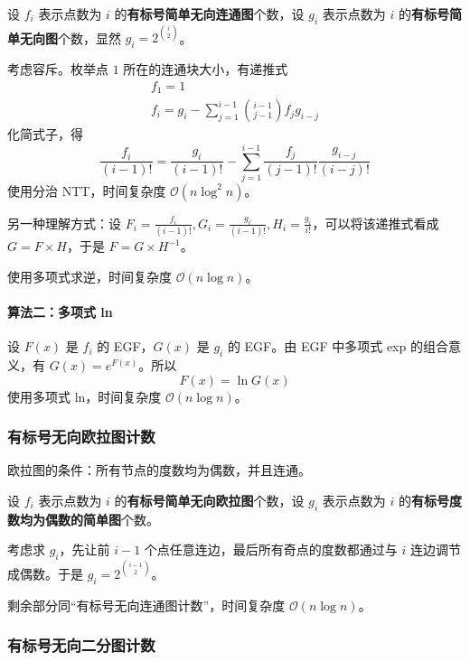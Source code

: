 设 $f_i$ 表示点数为 $i$ 的\textbf{有标号简单无向连通图}个数，设 $g_i$ 表示点数为 $i$ 的\textbf{有标号简单无向图}个数，显然 $g_i = 2^{\binom{i}{2}}$。

考虑容斥。枚举点 $1$ 所在的连通块大小，有递推式
\[
\begin{gathered}
f_1 = 1 \\
f_i = g_i - \sum_{j = 1}^{i - 1}\binom{i - 1}{j - 1}f_jg_{i - j}
\end{gathered}
\]
化简式子，得
\[
\frac{f_i}{(i - 1)!} = \frac{g_i}{(i - 1)!} - \sum_{j = 1}^{i - 1}\frac{f_j}{(j - 1)!} \frac{g_{i - j}}{(i - j)!}
\]
使用分治 NTT，时间复杂度 $\mathcal{O}(n \log^2 n)$。

\begin{quoteblock}
另一种理解方式：设 $F_i = \frac{f_i}{(i - 1)!}, G_i = \frac{g_i}{(i - 1)!}, H_i = \frac{g_i}{i!}$，可以将该递推式看成 $G = F \times H$，于是 $F = G \times H^{-1}$。

使用多项式求逆，时间复杂度 $\mathcal{O}(n \log n)$。
\end{quoteblock}

\paragraph{算法二：多项式 ln}

设 $F(x)$ 是 $f_i$ 的 EGF，$G(x)$ 是 $g_i$ 的 EGF。由 EGF 中多项式 exp 的组合意义，有 $G(x) = e^{F(x)}$。所以
\[
F(x) = \ln G(x)
\]
使用多项式 ln，时间复杂度 $\mathcal{O}(n \log n)$。


\subsubsection{有标号无向欧拉图计数}

欧拉图的条件：所有节点的度数均为偶数，并且连通。

设 $f_i$ 表示点数为 $i$ 的\textbf{有标号简单无向欧拉图}个数，设 $g_i$ 表示点数为 $i$ 的\textbf{有标号度数均为偶数的简单图}个数。

考虑求 $g_i$，先让前 $i - 1$ 个点任意连边，最后所有奇点的度数都通过与 $i$ 连边调节成偶数。于是 $g_i = 2^{\binom{i - 1}{2}}$。

剩余部分同“有标号无向连通图计数”，时间复杂度 $\mathcal{O}(n \log n)$。


\subsubsection{有标号无向二分图计数}

